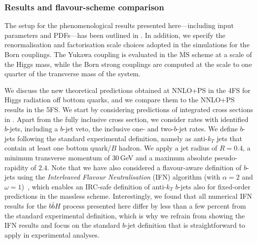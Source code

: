 \documentclass[11pt,a4paper]{article}
\begin{document}
\subsubsection{Results and flavour-scheme comparison}
The setup for the phenomenological results presented here---including input parameters and PDFs---has been outlined in . In addition, we specify the renormalisation and factorisation scale choices adopted in the \minnlo{} simulations for the Born couplings. The Yukawa coupling is evaluated in the $\overline{\text{MS}}$ scheme at a scale of the Higgs mass, while the Born strong couplings are computed at the scale to one quarter of the transverse mass of the \bbH{} system.

We discuss the new theoretical predictions obtained at NNLO+PS in the 4FS for Higgs radiation off bottom quarks, and we compare them to the NNLO+PS results
in the 5FS. We start by considering predictions of integrated cross sections in . Apart from the fully inclusive cross section, we consider rates with identified $b$-jets, including a $b$-jet veto, the inclusive one- and two-$b$-jet rates. We define $b$-jets following the 
standard experimental definition, namely as anti-$k_T$ jets that 
contain at least one bottom quark/$B$ hadron. 
We apply a jet radius of $R=0.4$, a minimum transverse momentum of $30$\,GeV and a 
maximum absolute pseudo-rapidity of $2.4$. Note that we have also considered a flavour-aware definition of $b$-jets using the 
{\it Interleaved Flavour Neutralisation} (IFN) algorithm (with $\alpha = 2$ and $\omega = 1$)~\cite{Caola:2023wpj}, 
which enables an IRC-safe definition of anti-$k_T$ $b$-jets also for fixed-order predictions in the massless scheme. 
Interestingly, we found that all numerical IFN results for the $b\bar b H$ process presented here differ by less than 
a few percent from the standard experimental definition, which is why we refrain from showing the IFN results and focus 
on the standard $b$-jet definition that is straightforward to apply in experimental analyses.
\end{document}
